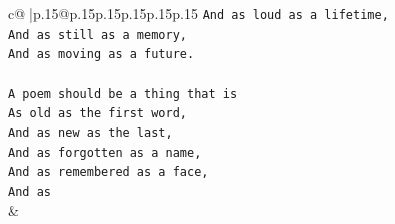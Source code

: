 \documentclass{article}
\begin{document}
{\begin{supertabular}{c@{$\;$}|p{.15\linewidth}@{}p{.15\linewidth}p{.15\linewidth}p{.15\linewidth}p{.15\linewidth}p{.15\linewidth}}
{{{\texttt{And as loud as a lifetime,} \\
\texttt{And as still as a memory,} \\
\texttt{And as moving as a future.} \\
\\ 
\texttt{A poem should be a thing that is} \\
\texttt{As old as the first word,} \\
\texttt{And as new as the last,} \\
\texttt{And as forgotten as a name,} \\
\texttt{And as remembered as a face,} \\
\texttt{And as} \\
            }
        }
    }
    & \\ \\


\end{supertabular}}
\end{document}
